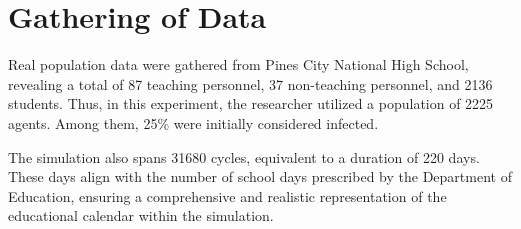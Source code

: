 \section{Gathering of Data}
Real population data were gathered from Pines City National High School, revealing a total of 87 teaching personnel, 37 non-teaching personnel, and 2136 students. Thus, in this experiment, the researcher utilized a population of 2225 agents. Among them, 25\% were initially considered infected.

The simulation also spans 31680 cycles, equivalent to a duration of 220 days. These days align with the number of school days prescribed by the Department of Education, ensuring a comprehensive and realistic representation of the educational calendar within the simulation.
